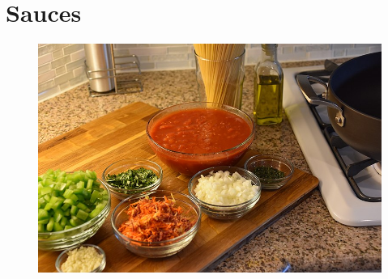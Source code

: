 \documentclass[11pt]{report}
\begin{document}
\chapter{Sauces}
\begin{figure}[h]
\begin{center}
   \includegraphics[width=\linewidth]{images/800px-Making_Spaghetti_Sauce.jpg}
\end{center}
\end{figure}
\newpage




\end{document}
